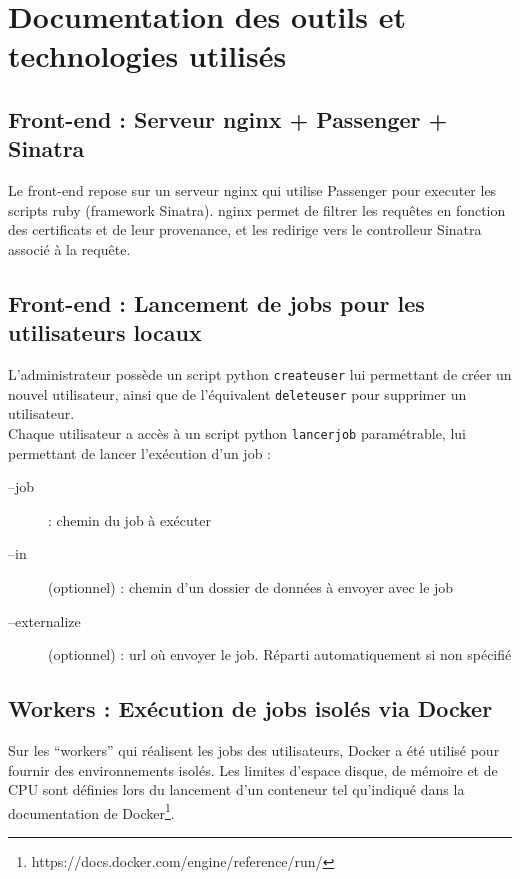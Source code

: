 \newpage

\chapter{Documentation des outils et technologies utilisés}

\section{Front-end : Serveur nginx + Passenger + Sinatra}

Le front-end repose sur un serveur nginx qui utilise Passenger pour executer les scripts ruby (framework Sinatra).
nginx permet de filtrer les requêtes en fonction des certificats et de leur provenance, et les redirige vers le controlleur Sinatra associé à la requête.

\section{Front-end : Lancement de jobs pour les utilisateurs locaux} 

L'administrateur possède un script python {\tt createuser} lui permettant de créer un nouvel utilisateur, ainsi que de l'équivalent {\tt deleteuser} pour supprimer un utilisateur. \\

Chaque utilisateur a accès à un script python {\tt lancerjob} paramétrable, lui permettant de lancer l'exécution d'un job :\\
\begin{description}
	\item[--job] : chemin du job à exécuter
	\item[--in] (optionnel) : chemin d'un dossier de données à envoyer avec le job
	\item[--externalize] (optionnel) : url où envoyer le job. Réparti automatiquement si non spécifié
\end{description}

\section{Workers : Exécution de jobs isolés via Docker}

Sur les ``workers'' qui réalisent les jobs des utilisateurs, Docker a été utilisé pour fournir des environnements
isolés. Les limites d'espace disque, de mémoire et de CPU sont définies lors du lancement d'un conteneur tel qu'indiqué
dans la documentation de Docker\footnote{https://docs.docker.com/engine/reference/run/}.

